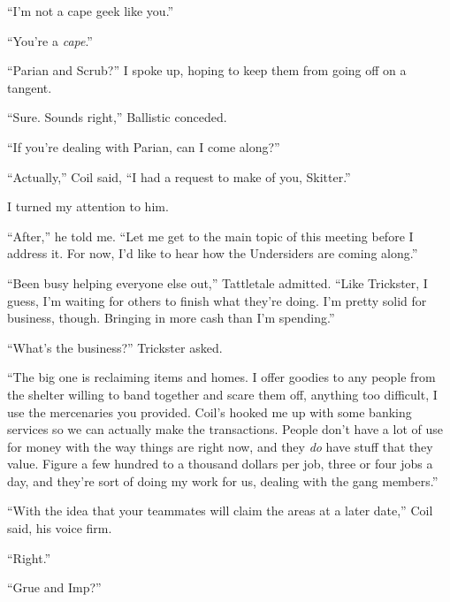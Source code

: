 ``I'm not a cape geek like you.''



``You're a \emph{cape}.''



``Parian and Scrub?'' I spoke up, hoping to keep them from going off on a tangent.



``Sure.  Sounds right,'' Ballistic conceded.



``If you're dealing with Parian, can I come along?''



``Actually,'' Coil said, ``I had a request to make of you, Skitter.''



I turned my attention to him.



``After,'' he told me.  ``Let me get to the main topic of this meeting before I address it.  For now, I'd like to hear how the Undersiders are coming along.''



``Been busy helping everyone else out,'' Tattletale admitted.  ``Like Trickster, I guess, I'm waiting for others to finish what they're doing.  I'm pretty solid for business, though.  Bringing in more cash than I'm spending.''



``What's the business?''  Trickster asked.



``The big one is reclaiming items and homes.  I offer goodies to any people from the shelter willing to band together and scare them off, anything too difficult, I use the mercenaries you provided.  Coil's hooked me up with some banking services so we can actually make the transactions.  People don't have a lot of use for money with the way things are right now, and they \emph{do} have stuff that they value.  Figure a few hundred to a thousand dollars per job, three or four jobs a day, and they're sort of doing my work for us, dealing with the gang members.''



``With the idea that your teammates will claim the areas at a later date,'' Coil said, his voice firm.



``Right.''



``Grue and Imp?''



